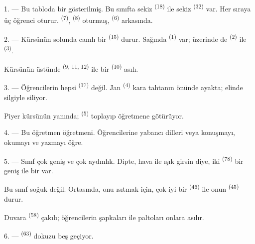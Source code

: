 \VUsaut{1.4mm}
\VUsaut{2.2mm}
\VUfilet{20mm}
\VUsaut{6.4mm}

\VUsaut{3.0mm}

1. --- Bu tabloda bir   gösterilmiş. Bu sınıfta
sekiz  \textsuperscript{(18)} ile sekiz 
\textsuperscript{(32)} var. Her sıraya üç öğrenci oturur. 
\textsuperscript{(7)},  \textsuperscript{(8)} oturmuş,
 \textsuperscript{(6)} arkasında.

2. --- Kürsünün solunda camlı bir  \textsuperscript{(15)} durur.
Sağında  \textsuperscript{(1)} var; üzerinde de
 \textsuperscript{(2)} ile 
\textsuperscript{(3)}.

Kürsünün üstünde  \textsuperscript{(9, 11, 12)} ile bir
 \textsuperscript{(10)} asılı.

3. --- Öğrencilerin hepsi  \textsuperscript{(17)} değil. Jan
\textsuperscript{(4)} kara tahtanın önünde ayakta; elinde silgiyle
 siliyor.

Piyer kürsünün yanında;  \textsuperscript{(5)}
toplayıp öğretmene götürüyor.

4. --- Bu öğretmen  öğretmeni. Öğrencilerine yabancı
dilleri  veya
 konuşmayı, okumayı ve yazmayı öğre.

5. --- Sınıf çok geniş ve çok aydınlık. Dipte, hava ile ışık girsin diye,
iki  \textsuperscript{(78)} bir geniş  ile bir
 var.

Bu sınıf soğuk değil. Ortasında, onu ısıtmak için, çok iyi bir
 \textsuperscript{(46)} ile onun 
\textsuperscript{(45)} durur.

Duvara  \textsuperscript{(58)} çakılı; öğrencilerin şapkaları
ile paltoları onlara asılır.

\VUsaut{5.2mm}
\VUsaut{3.6mm}

6. ---  \textsuperscript{(63)} dokuzu beş geçiyor.

